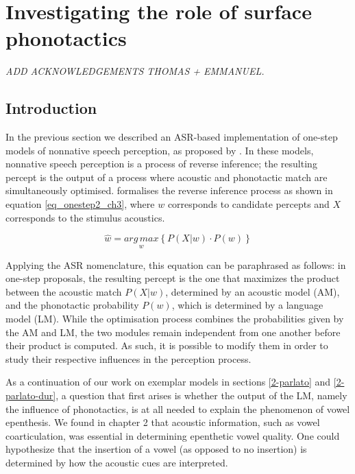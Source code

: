 \newpage
\section{Investigating the role of surface phonotactics} \label{3-surfphono}

\small{\textit{{\color{red}ADD ACKNOWLEDGEMENTS THOMAS + EMMANUEL.\\}}}

\subsection{Introduction}

In the previous section we described an ASR-based implementation of one-step models of nonnative speech perception, as proposed by \cite{dupoux2011, wilson2013}. In these models, nonnative speech perception is a process of reverse inference; the resulting percept is the output of a process where acoustic and phonotactic match are simultaneously optimised. \cite{wilson2013} formalises the reverse inference process as shown in equation \ref{eq_onestep2_ch3}, where $w$ corresponds to candidate percepts and $X$ corresponds to the stimulus acoustics.

\begin{equation}
  \widehat{w} = \underset{w}{arg\,max} \left \{ P(X|w) \cdot P(w) \right \}
  \label{eq_onestep2_ch3}
\end{equation}

Applying the ASR nomenclature, this equation can be paraphrased as follows: in one-step proposals, the resulting percept is the one that maximizes the product between the acoustic match $P(X|w)$, determined by an acoustic model (AM), and the phonotactic probability  $P(w)$, which is determined by a language model (LM).
While the optimisation process combines the probabilities given by the AM and LM, the two modules remain independent from one another before their product is computed. As such, it is possible to modify them in order to study their respective influences in the perception process.   

As a continuation of our work on exemplar models in sections \ref{2-parlato} and \ref{2-parlato-dur}, a question that first arises is whether the output of the LM, namely the influence of phonotactics, is at all needed to explain the phenomenon of vowel epenthesis. We found in chapter 2 that acoustic information, such as vowel coarticulation, was essential in determining epenthetic vowel quality. One could hypothesize that the insertion of a vowel (as opposed to no insertion) is determined by how the acoustic cues are interpreted.

